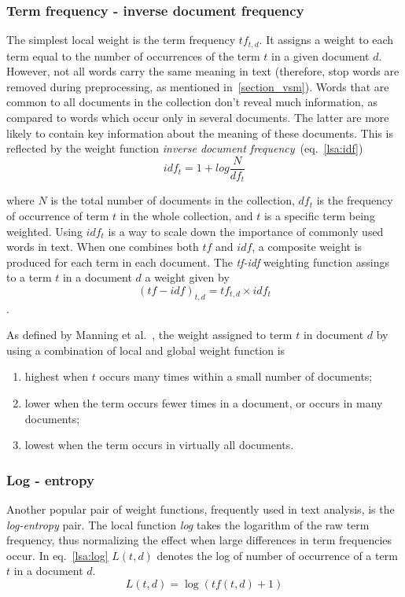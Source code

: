 \subsubsection{Term frequency - inverse document frequency}
\label{lsa:tf-idf-section}
The simplest local weight is the term frequency $tf_{t,d}$. It assigns a weight to each term equal to the number of occurrences of the term $t$ in a given document $d$. However, not all words carry the same meaning in text (therefore, stop words are removed during preprocessing, as mentioned in~\ref{section_vsm}). Words that are common to all documents in the collection don't reveal much information, as compared to words which occur only in several documents. The latter are more likely to contain key information about the meaning of these documents.  This is reflected by the weight function \textit{inverse document frequency}~(eq.~\ref{lsa:idf})
\begin{equation}
\label{lsa:idf}
idf_{t}=1 + log\frac{N}{df_{t}}
\end{equation}

where $N$ is the total number of documents in the collection, $df_{t}$ is the frequency of occurrence of term $t$ in the whole collection, and $t$ is a specific term being weighted. Using $idf_{t}$ is a way to scale down the importance of commonly used words in text. When one combines both $tf$ and $idf$, a composite weight is produced for each term in each document. The \textit{tf-idf} weighting function assings to a term $t$ in a document $d$ a weight given by 
\begin{equation}
\label{lsa:tf_idf}
(tf-idf)_{t,d}=tf_{t,d} \times idf_{t}
\end{equation}. 

As defined by Manning et al.~\cite{IRbook2008}, the weight assigned to term $t$ in document $d$ by using a combination of local and global weight function is 
\begin{enumerate}
\item highest when $t$ occurs many times within a small number of documents;
\item lower when the term occurs fewer times in a document, or occurs in many documents;
\item lowest when the term occurs in virtually all documents.
\end{enumerate} 

\subsubsection{Log - entropy}
\label{lsa:log-entropy-section}
Another popular pair of weight functions, frequently used in text analysis, is the \textit{log-entropy} pair. The local function \textit{log} takes the logarithm of the raw term frequency, thus normalizing the effect when large differences in term frequencies occur. In eq.~\ref{lsa:log} $L(t,d)$ denotes the log of number of occurrence of a term $t$ in a document $d$. \\
\begin{equation}
L(t,d)=\log(tf(t,d)+1)
\label{lsa:log}
\end{equation}

